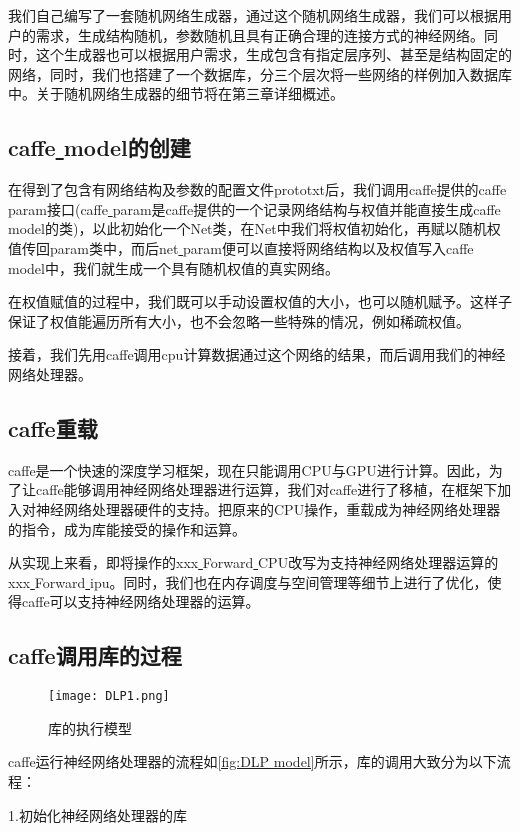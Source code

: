 我们自己编写了一套随机网络生成器，通过这个随机网络生成器，我们可以根据用户的需求，生成结构随机，参数随机且具有正确合理的连接方式的神经网络。同时，这个生成器也可以根据用户需求，生成包含有指定层序列、甚至是结构固定的网络，同时，我们也搭建了一个数据库，分三个层次将一些网络的样例加入数据库中。关于随机网络生成器的细节将在第三章详细概述。

\subsection{caffe\underline{ }model的创建}
在得到了包含有网络结构及参数的配置文件prototxt后，我们调用caffe提供的caffe\underline{ }param接口(caffe\underline{ }param是caffe提供的一个记录网络结构与权值并能直接生成caffe\underline{ }model的类)，以此初始化一个Net类，在Net中我们将权值初始化，再赋以随机权值传回param类中，而后net\underline{ }param便可以直接将网络结构以及权值写入caffe\underline{ }model中，我们就生成一个具有随机权值的真实网络。

在权值赋值的过程中，我们既可以手动设置权值的大小，也可以随机赋予。这样子保证了权值能遍历所有大小，也不会忽略一些特殊的情况，例如稀疏权值。

接着，我们先用caffe调用cpu计算数据通过这个网络的结果，而后调用我们的神经网络处理器。

\subsection{caffe重载}
caffe是一个快速的深度学习框架，现在只能调用CPU与GPU进行计算。因此，为了让caffe能够调用神经网络处理器进行运算，我们对caffe进行了移植，在框架下加入对神经网络处理器硬件的支持。把原来的CPU操作，重载成为神经网络处理器的指令，成为库能接受的操作和运算。

从实现上来看，即将操作的xxx\underline{ }Forward\underline{ }CPU改写为支持神经网络处理器运算的xxx\underline{ }Forward\underline{ }ipu。同时，我们也在内存调度与空间管理等细节上进行了优化，使得caffe可以支持神经网络处理器的运算。

\subsection{caffe调用库的过程}
\begin{figure}[!htbp]
\centering
\texttt{[image: DLP1.png]}
\caption{库的执行模型}
\label{fig:DLP model}
\end{figure}
caffe运行神经网络处理器的流程如\autoref{fig:DLP model}所示，库的调用大致分为以下流程：

1.初始化神经网络处理器的库

